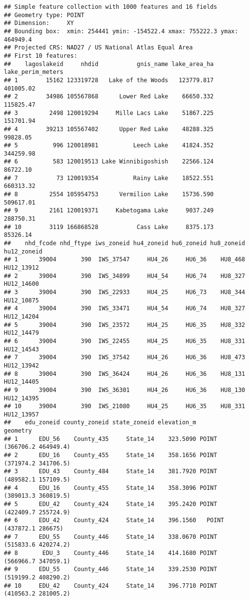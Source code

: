 \documentclass[
]{book}
\begin{document}
\begin{verbatim}
## Simple feature collection with 1000 features and 16 fields
## Geometry type: POINT
## Dimension:     XY
## Bounding box:  xmin: 254441 ymin: -154522.4 xmax: 755222.3 ymax: 464949.4
## Projected CRS: NAD27 / US National Atlas Equal Area
## First 10 features:
##    lagoslakeid     nhdid           gnis_name lake_area_ha lake_perim_meters
## 1        15162 123319728   Lake of the Woods   123779.817         401005.02
## 2        34986 105567868      Lower Red Lake    66650.332         115825.47
## 3         2498 120019294     Mille Lacs Lake    51867.225         151701.94
## 4        39213 105567402      Upper Red Lake    48288.325          99828.05
## 5          996 120018981          Leech Lake    41824.352         344259.98
## 6          583 120019513 Lake Winnibigoshish    22566.124          86722.10
## 7           73 120019354          Rainy Lake    18522.551         660313.32
## 8         2554 105954753      Vermilion Lake    15736.590         509617.01
## 9         2161 120019371     Kabetogama Lake     9037.249         288750.31
## 10        3119 166868528           Cass Lake     8375.173          85326.14
##    nhd_fcode nhd_ftype iws_zoneid hu4_zoneid hu6_zoneid hu8_zoneid hu12_zoneid
## 1      39004       390  IWS_37547     HU4_26     HU6_36    HU8_468  HU12_13912
## 2      39004       390  IWS_34899     HU4_54     HU6_74    HU8_327  HU12_14600
## 3      39004       390  IWS_22933     HU4_25     HU6_73    HU8_344  HU12_10875
## 4      39004       390  IWS_33471     HU4_54     HU6_74    HU8_327  HU12_14204
## 5      39004       390  IWS_23572     HU4_25     HU6_35    HU8_332  HU12_14479
## 6      39004       390  IWS_22455     HU4_25     HU6_35    HU8_331  HU12_14543
## 7      39004       390  IWS_37542     HU4_26     HU6_36    HU8_473  HU12_13942
## 8      39004       390  IWS_36424     HU4_26     HU6_36    HU8_131  HU12_14405
## 9      39004       390  IWS_36301     HU4_26     HU6_36    HU8_130  HU12_14395
## 10     39004       390  IWS_21080     HU4_25     HU6_35    HU8_331  HU12_13957
##    edu_zoneid county_zoneid state_zoneid elevation_m                  geometry
## 1      EDU_56    County_435     State_14    323.5090 POINT (366706.2 464949.4)
## 2      EDU_16    County_455     State_14    358.1656 POINT (371974.2 341706.5)
## 3      EDU_43    County_484     State_14    381.7920 POINT (489582.1 157109.5)
## 4      EDU_16    County_455     State_14    358.3096 POINT (389013.3 360819.5)
## 5      EDU_42    County_424     State_14    395.2420 POINT (422409.7 255724.9)
## 6      EDU_42    County_424     State_14    396.1560   POINT (437872.1 286675)
## 7      EDU_55    County_446     State_14    338.0670 POINT (515833.6 420274.2)
## 8       EDU_3    County_446     State_14    414.1680 POINT (566966.7 347059.1)
## 9      EDU_55    County_446     State_14    339.2530 POINT (519199.2 408290.2)
## 10     EDU_42    County_424     State_14    396.7710 POINT (410563.2 281005.2)
\end{verbatim}
\end{document}

